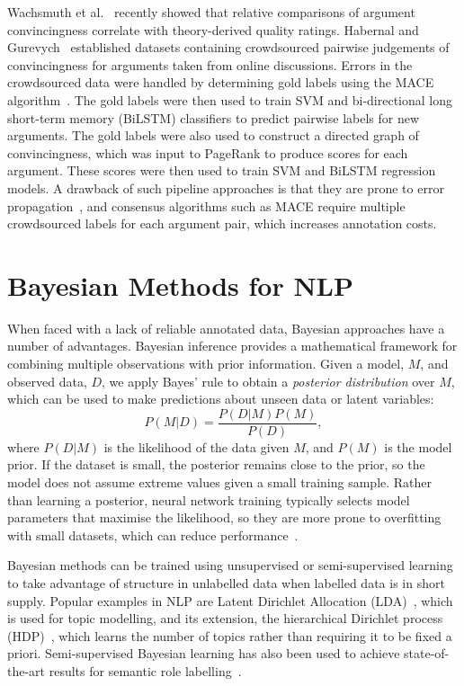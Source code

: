 Wachsmuth et al.~ recently showed
 that relative comparisons of argument convincingness correlate with theory-derived quality ratings.
Habernal and Gurevych~ established datasets
containing crowdsourced pairwise judgements of convincingness for arguments taken from online discussions. 
Errors in the crowdsourced data were handled by determining gold labels using the MACE algorithm~\cite{hovy2013learning}.
The gold labels were then used to train SVM and bi-directional long short-term memory (BiLSTM) classifiers to predict pairwise
labels for new arguments. 
The gold labels were also used to construct a directed graph of convincingness, which was input to PageRank 
to produce scores for each argument. 
These scores were then used to train SVM and BiLSTM regression models.
A drawback of such pipeline approaches is that they are prone to error propagation~\cite{chen2016joint},
and consensus algorithms such as MACE require multiple crowdsourced labels for each argument pair, 
which increases annotation costs.

\section{Bayesian Methods for NLP}\label{sec:bayesian}

When faced with a lack of reliable annotated data, 
Bayesian approaches have a number of advantages.
Bayesian inference provides a mathematical framework for combining multiple observations
with prior information. 
Given a model, $M$, and observed data, $D$, we apply Bayes' rule
to obtain a \emph{posterior distribution} over $M$, which can be used to make predictions 
about unseen data or latent variables:
\begin{equation}
  P(M|D) = \frac{P(D|M)P(M)}{P(D)},
  \label{eq:bayesrule}
\end{equation}
where $P(D|M)$ is the likelihood of the data given $M$, and $P(M)$ is the model prior.
If the dataset is small, the posterior remains close to the prior, so the model 
does not assume extreme values given a small training sample.
Rather than learning a posterior, neural network training typically selects model parameters that maximise the likelihood, 
so they are more prone to overfitting with small datasets, which can reduce performance~\cite{xiong2011bayesian}.

Bayesian methods can be trained using unsupervised or semi-supervised learning
to take advantage of structure in unlabelled data when labelled data is in short supply.
Popular examples in NLP are
Latent Dirichlet Allocation (LDA)~\cite{blei2003latent}, which is used for topic modelling,
and its extension, the hierarchical Dirichlet process (HDP)~\cite{teh2005sharing}, which learns the number of topics rather than requiring it to be fixed a priori.
Semi-supervised Bayesian learning
has also been used to achieve state-of-the-art results for semantic role labelling~\cite{titov2012bayesian}.

